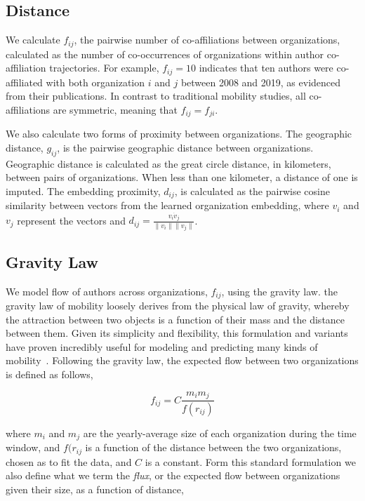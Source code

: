 \documentclass[12pt]{article} %
\begin{document}
%
%
\subsection{Distance}
We calculate $f_{ij}$, the pairwise number of co-affiliations between organizations, calculated as the number of co-occurrences of organizations within author co-affiliation trajectories. 
For example, $f_{ij} = 10$ indicates that ten authors were co-affiliated with both organization $i$ and $j$ between 2008 and 2019, as evidenced from their publications. 
In contrast to traditional mobility studies, all co-affiliations are symmetric, meaning that $f_{ij} = f_{ji}$. 

We also calculate two forms of proximity between organizations. 
The geographic distance, $g_{ij}$, is the pairwise geographic distance between organizations.
Geographic distance is calculated as the great circle distance, in kilometers, between pairs of organizations. 
When less than one kilometer, a distance of one is imputed. 
The embedding proximity, $d_{ij}$, is calculated as the pairwise cosine similarity between vectors from the learned organization embedding, where $v_{i}$ and $v_{j}$ represent the vectors and $d_{ij} = \frac{v_{i} \dot v_{j}}{\lVert v_{i} \rVert \lVert v_{j} \rVert}$.


\subsection{Gravity Law}

We model flow of authors across organizations, $f_{ij}$, using the gravity law. 
the gravity law of mobility loosely derives from the physical law of gravity, whereby the attraction between two objects is a function of their mass and the distance between them.
Given its simplicity and flexibility, this formulation and variants have proven incredibly useful for modeling and predicting many kinds of mobility~\cite{jung2008highwaygravity, curiel2018citygravity, lewer2008immigrationgravity, xia2005measlesgravity, truscott2012epidemicgravity, hong2016busgravity}.
Following the gravity law, the expected flow between two organizations is defined as follows,

\begin{equation}
	\label{eq:gravity_basic}
	f_{ij} = C\frac{m_{i}m_{j}}{f(r_{ij})}
\end{equation}

where $m_{i}$ and $m_{j}$ are the yearly-average size of each organization during the time window, and $f(r_{ij}$ is a function of the distance between the two organizations, chosen as to fit the data, and $C$ is a constant. 
Form this standard formulation we also define what we term the \textit{flux}, or the expected flow between organizations given their size, as a function of distance,
\end{document}

